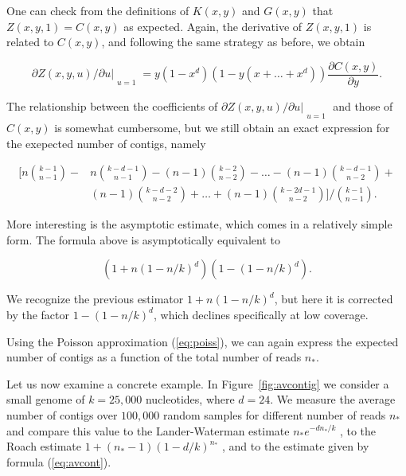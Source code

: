 \documentclass{article}
\begin{document}
One can check from the definitions of $K(x,y)$ and $G(x,y)$ that $Z(x,y,1)
= C(x,y)$ as expected. Again, the derivative of $Z(x,y,1)$ is related to
$C(x,y)$, and following the same strategy as before, we obtain

\begin{equation*}
\partial Z(x,y,u)/\partial u|_{\substack{\\u=1}}
= y(1-x^d)\left( 1 - y(x+\ldots+x^d) \right)
\frac{\partial C(x,y)}{\partial y}.
\end{equation*}

The relationship between the coefficients of $\partial Z(x,y,u) /\partial
u|_{\substack{\\u=1}}$ and those of $C(x,y)$ is somewhat cumbersome, but
we still obtain an exact expression for the exepected number of contigs,
namely

\begin{equation*}
\begin{split}
\Bigg[ n{k-1 \choose n-1} - &n{k-d-1 \choose n-1} -
(n-1){k-2 \choose n-2} - \ldots - (n-1) {k-d-1 \choose n-2} +
\\ &(n-1){k-d-2 \choose n-2} +
\ldots + (n-1){k-2d-1 \choose n-2} \Bigg] \Big/ {k-1 \choose n-1}.
\end{split}
\end{equation*}

More interesting is the asymptotic estimate, which comes in a relatively
simple form. The formula above is asymptotically equivalent to

\begin{equation}
\label{eq:avcont}
\left( 1+n(1-n/k)^d \right) \left(1-(1-n/k)^d\right).
\end{equation}

We recognize the previous estimator $1+n(1-n/k)^d$, but here it is
corrected by the factor $1-(1-n/k)^d$, which declines specifically at low
coverage.

Using the Poisson approximation (\ref{eq:poiss}), we can again express the
expected number of contigs as a function of the total number of reads
$n_*$.

Let us now examine a concrete example. In Figure~\ref{fig:avcontig} we
consider a small genome of $k = 25,000$ nucleotides, where $d=24$.
We measure the average number of contigs over
$100,000$ random samples for different number of reads $n_*$ and compare
this value to the Lander-Waterman estimate $n_*e^{-dn_*/k}$
\cite{pmid3294162}, to the Roach estimate $1+(n_*-1)(1-d/k)^{n_*}$
\cite{pmid8808467}, and to the estimate given by formula
(\ref{eq:avcont}).
\end{document}

